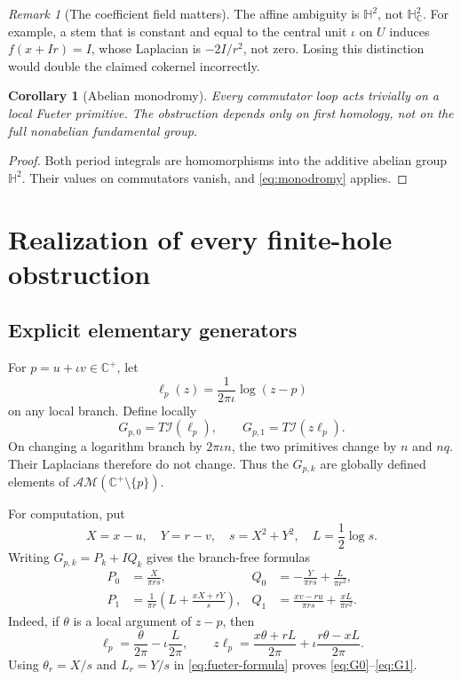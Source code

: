 \documentclass[11pt,a4paper]{article}
\numberwithin{equation}{section}
\newtheorem{corollary}[theorem]{Corollary}
\theoremstyle{definition}
\theoremstyle{remark}
\newtheorem{remark}[theorem]{Remark}
\newcommand{\C}{\mathbb C}
\newcommand{\HH}{\mathbb H}
\newcommand{\HC}{\mathbb H_{\C}}
\newcommand{\ic}{\iota}
\newcommand{\AM}{\mathcal{AM}}
\newcommand{\cI}{\mathcal I}
\begin{document}
\begin{remark}[The coefficient field matters]
The affine ambiguity is $\HH^2$, not $\HC^2$. For example, a stem that is
constant and equal to the central unit $\ic$ on $U$ induces $f(x+Ir)=I$,
whose Laplacian is $-2I/r^2$, not zero. Losing this distinction would double
the claimed cokernel incorrectly.
\end{remark}

\begin{corollary}[Abelian monodromy]\label{cor:abelian}
Every commutator loop acts trivially on a local Fueter primitive. The
obstruction depends only on first homology, not on the full nonabelian
fundamental group.
\end{corollary}
\begin{proof}
Both period integrals are homomorphisms into the additive abelian group
$\HH^2$. Their values on commutators vanish, and
\eqref{eq:monodromy} applies.
\end{proof}

\section{Realization of every finite-hole obstruction}
\label{sec:splitting}

\subsection{Explicit elementary generators}
For $p=u+\ic v\in\C^+$, let
\[
 \ell_p(z)=\frac{1}{2\pi\ic}\log(z-p)
\]
on any local branch. Define locally
\begin{equation}
 G_{p,0}=T\cI(\ell_p),\qquad
 G_{p,1}=T\cI(z\ell_p).
 \label{eq:generators}
\end{equation}
On changing a logarithm branch by $2\pi\ic n$, the two primitives change
by $n$ and $nq$. Their Laplacians therefore do not change. Thus the $G_{p,k}$
are globally defined elements of $\AM(\C^+\setminus\{p\})$.

For computation, put
\[
 X=x-u,\quad Y=r-v,\quad s=X^2+Y^2,\quad L=\frac12\log s.
\]
Writing $G_{p,k}=P_k+I Q_k$ gives the branch-free formulas
\begin{align}
 P_0&=\frac{X}{\pi r s},&
 Q_0&=-\frac{Y}{\pi r s}+\frac{L}{\pi r^2},\label{eq:G0}\\
 P_1&=\frac1{\pi r}\left(L+\frac{xX+rY}{s}\right),&
 Q_1&=\frac{xv-ru}{\pi r s}+\frac{xL}{\pi r^2}.
 \label{eq:G1}
\end{align}
Indeed, if $\theta$ is a local argument of $z-p$, then
\[
 \ell_p=\frac{\theta}{2\pi}-\ic\frac L{2\pi},\qquad
 z\ell_p=\frac{x\theta+rL}{2\pi}
          +\ic\frac{r\theta-xL}{2\pi}.
\]
Using $\theta_r=X/s$ and $L_r=Y/s$ in
\eqref{eq:fueter-formula} proves \eqref{eq:G0}--\eqref{eq:G1}.
\end{document}
